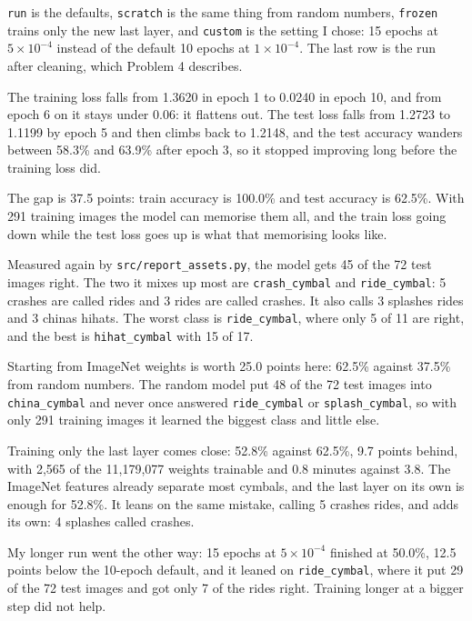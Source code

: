 \documentclass[11pt]{article}
\begin{document}
\texttt{run} is the defaults, \texttt{scratch} is the same thing from random
numbers, \texttt{frozen} trains only the new last layer, and \texttt{custom} is
the setting I chose: 15 epochs at $5 \times 10^{-4}$ instead of the default 10
epochs at $1 \times 10^{-4}$. The last row is the run after cleaning, which
Problem 4 describes.


The training loss falls from 1.3620 in epoch 1 to 0.0240 in epoch 10, and from
epoch 6 on it stays under 0.06: it flattens out. The test loss falls from 1.2723
to 1.1199 by epoch 5 and then climbs back to 1.2148, and the test accuracy
wanders between 58.3\% and 63.9\% after epoch 3, so it stopped improving long
before the training loss did.

The gap is 37.5 points: train accuracy is 100.0\% and test accuracy is 62.5\%.
With 291 training images the model can memorise them all, and the train loss
going down while the test loss goes up is what that memorising looks like.

\begin{center}\end{center}

Measured again by \texttt{src/report\_assets.py}, the model gets 45 of the 72
test images right. The two it mixes up most are \texttt{crash\_cymbal} and
\texttt{ride\_cymbal}: 5 crashes are called rides and 3 rides are called
crashes. It also calls 3 splashes rides and 3 chinas hihats. The worst class is
\texttt{ride\_cymbal}, where only 5 of 11 are right, and the best is
\texttt{hihat\_cymbal} with 15 of 17.

Starting from ImageNet weights is worth 25.0 points here: 62.5\% against 37.5\%
from random numbers. The random model put 48 of the 72 test images into
\texttt{china\_cymbal} and never once answered \texttt{ride\_cymbal} or
\texttt{splash\_cymbal}, so with only 291 training images it learned the biggest
class and little else.

Training only the last layer comes close: 52.8\% against 62.5\%, 9.7 points
behind, with 2,565 of the 11,179,077 weights trainable and 0.8 minutes against
3.8. The ImageNet features already separate most cymbals, and the last layer on
its own is enough for 52.8\%. It leans on the same mistake, calling 5 crashes
rides, and adds its own: 4 splashes called crashes.

My longer run went the other way: 15 epochs at $5 \times 10^{-4}$ finished at
50.0\%, 12.5 points below the 10-epoch default, and it leaned on
\texttt{ride\_cymbal}, where it put 29 of the 72 test images and got only 7 of
the rides right. Training longer at a bigger step did not help.
\end{document}
